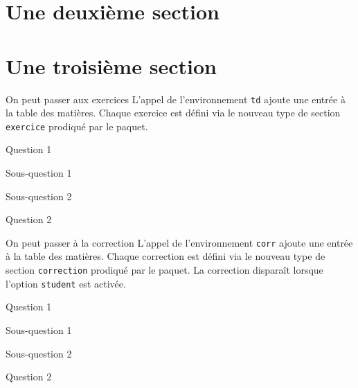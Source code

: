 \documentclass[12pt, fleqn]{book}
\begin{document}
\section{Une deuxième section}
\section{Une troisième section}

\begin{td}{On peut passer aux exercices}
	L'appel de l'environnement \texttt{td} ajoute une entrée à la table
	des matières. Chaque exercice est défini via le nouveau type de section 
	\texttt{exercice} prodiqué par le paquet.
\begin{exlist}
\item Question 1
	\begin{exlist}
	\item Sous-question 1
	\item Sous-question 2
	\end{exlist}
\item Question 2
\end{exlist}

\end{td}

\begin{corr}{On peut passer à la correction}
	L'appel de l'environnement \texttt{corr} ajoute une entrée à la table
	des matières. Chaque correction est défini via le nouveau type de section 
	\texttt{correction} prodiqué par le paquet. La correction 
	disparaît lorsque l'option \texttt{student} est activée.
\begin{corrlist}
\item Question 1
	\begin{corrlist}
	\item Sous-question 1
	\item Sous-question 2
	\end{corrlist}
\item Question 2
\end{corrlist}
\end{corr}
\end{document}
